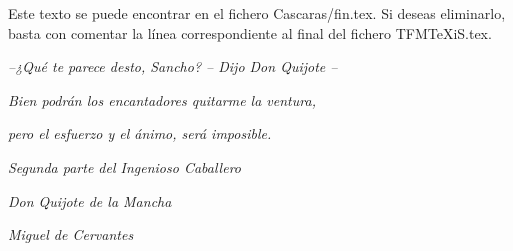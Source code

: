 %
%
%
%
%
%
%
%
%
%
%
%


\ifpdf
\fi

\thispagestyle{empty}\mbox{}

Este texto se puede encontrar en el fichero Cascaras/fin.tex. Si deseas eliminarlo, basta con comentar la línea correspondiente al final del fichero TFMTeXiS.tex.

\vspace*{4cm}

\small

\hfill \emph{--¿Qué te parece desto, Sancho? -- Dijo Don Quijote --}

\hfill \emph{Bien podrán los encantadores quitarme la ventura,}

\hfill \emph{pero el esfuerzo y el ánimo, será imposible.}

\hfill

\hfill \emph{Segunda parte del Ingenioso Caballero}

\hfill \emph{Don Quijote de la Mancha}

\hfill \emph{Miguel de Cervantes}

